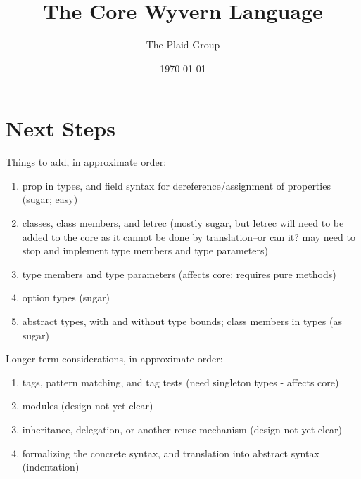 \documentclass[11pt]{article}
\title{The Core Wyvern Language}
\author{The Plaid Group}
\date{\today}
\begin{document}
\maketitle



\clearpage



\clearpage



\clearpage



\clearpage

\section{Next Steps}

Things to add, in approximate order:

\begin{enumerate}

\item prop in types, and field syntax for dereference/assignment of properties (sugar; easy)

\item classes, class members, and letrec (mostly sugar, but letrec will need to be added to the core as it cannot be done by translation--or can it?  may need to stop and implement type members and type parameters)

\item type members and type parameters (affects core; requires pure methods)

\item option types (sugar)

\item abstract types, with and without type bounds; class members in types (as sugar)

\end{enumerate}


Longer-term considerations, in approximate order:

\begin{enumerate}

\item tags, pattern matching, and tag tests (need singleton types - affects core)

\item modules (design not yet clear)

\item inheritance, delegation, or another reuse mechanism (design not yet clear)

\item formalizing the concrete syntax, and translation into abstract syntax (indentation)

\end{enumerate}
\end{document}

